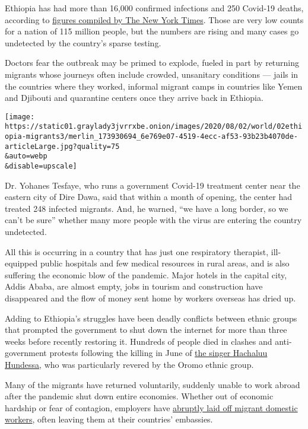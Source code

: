 Ethiopia has had more than 16,000 confirmed infections and 250 Covid-19
deaths, according to
\href{https://www.nytimes3xbfgragh.onion/interactive/2020/world/coronavirus-maps.html\#countries}{figures
compiled by The New York Times}. Those are very low counts for a nation
of 115 million people, but the numbers are rising and many cases go
undetected by the country's sparse testing.

Doctors fear the outbreak may be primed to explode, fueled in part by
returning migrants whose journeys often include crowded, unsanitary
conditions --- jails in the countries where they worked, informal
migrant camps in countries like Yemen and Djibouti and quarantine
centers once they arrive back in Ethiopia.

\texttt{[image: https://static01.graylady3jvrrxbe.onion/images/2020/08/02/world/02ethiopia-migrants3/merlin\_173930694\_6e769e07-4519-4ecc-af53-93b23b4070de-articleLarge.jpg?quality=75\\\&auto=webp\\\&disable=upscale]}

Dr. Yohanes Tesfaye, who runs a government Covid-19 treatment center
near the eastern city of Dire Dawa, said that within a month of opening,
the center had treated 248 infected migrants. And, he warned, ``we have
a long border, so we can't be sure'' whether many more people with the
virus are entering the country undetected.

All this is occurring in a country that has just one respiratory
therapist, ill-equipped public hospitals and few medical resources in
rural areas, and is also suffering the economic blow of the pandemic.
Major hotels in the capital city, Addis Ababa, are almost empty, jobs in
tourism and construction have disappeared and the flow of money sent
home by workers overseas has dried up.

Adding to Ethiopia's struggles have been deadly conflicts between ethnic
groups that prompted the government to shut down the internet for more
than three weeks before recently restoring it. Hundreds of people died
in clashes and anti-government protests following the killing in June of
\href{https://www.nytimes3xbfgragh.onion/2020/07/11/world/africa/ethiopia-hachalu-hundessa.html}{the
singer Hachaluu Hundessa}, who was particularly revered by the Oromo
ethnic group.

Many of the migrants have returned voluntarily, suddenly unable to work
abroad after the pandemic shut down entire economies. Whether out of
economic hardship or fear of contagion, employers have
\href{https://www.nytimes3xbfgragh.onion/2020/07/06/world/middleeast/coronavirus-saudi-domestic-workers-maids-arab.html}{abruptly
laid off migrant domestic workers}, often leaving them at their
countries' embassies.

